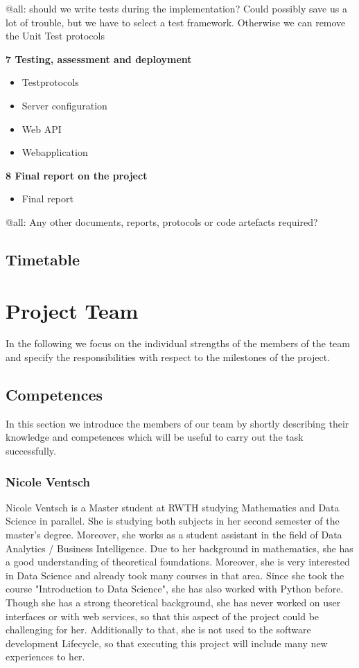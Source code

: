 \documentclass[notitlepage]{article}
\begin{document}
\begin{flushleft}
{\color{red} @all: should we write tests during the implementation? Could possibly save us a lot of trouble, but we have to select a test framework.
Otherwise we can remove the Unit Test protocols}

\textbf{7 Testing, assessment and deployment}
\\
\begin{itemize}
	\item Testprotocols
	\item Server configuration
	\item Web API 
	\item Webapplication
\end{itemize}

\textbf{8 Final report on the project}
\\
\begin{itemize}
	\item Final report
\end{itemize}

{\color{red} @all: Any other documents, reports, protocols or code artefacts required?}

\subsection{Timetable}

\section{Project Team}
In the following we focus on the individual strengths of the members of the team and specify the responsibilities with respect to the milestones of the project.

\subsection{Competences} 
In this section we introduce the members of our team by shortly describing their knowledge and competences which will be useful to carry out the task successfully.

\subsubsection*{Nicole Ventsch}

Nicole Ventsch is a Master student at RWTH studying Mathematics and Data Science in parallel. She is studying both subjects in her second semester of the master's degree. Moreover, she works as a student assistant in the field of Data Analytics / Business Intelligence. Due to her background in mathematics, she has a good understanding of theoretical foundations. Moreover, she is very interested in Data Science and already took many courses in that area. Since she took the course "Introduction to Data Science", she has also worked with Python before. Though she has a strong theoretical background, she has never worked on user interfaces or with web services, so that this aspect of the project could be challenging for her. Additionally to that, she is not used to the software development Lifecycle, so that executing this project will include many new experiences to her. 


\end{flushleft}
\end{document}
